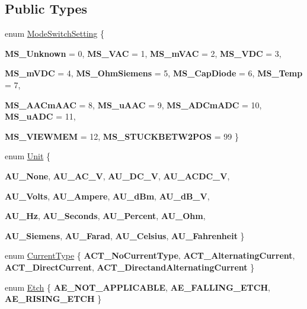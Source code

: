 \subsection*{Public Types}
\begin{DoxyCompactItemize}
\item 
enum \hyperlink{classFluke_1_1Fluke189DataResponseAnalyzerWrapper_a2ec2700a6086ae0ebd9601fe0c0f957a}{ModeSwitchSetting} \{ \par
{\bfseries MS\_\-Unknown} = 0, 
{\bfseries MS\_\-VAC} = 1, 
{\bfseries MS\_\-mVAC} = 2, 
{\bfseries MS\_\-VDC} = 3, 
\par
{\bfseries MS\_\-mVDC} = 4, 
{\bfseries MS\_\-OhmSiemens} = 5, 
{\bfseries MS\_\-CapDiode} = 6, 
{\bfseries MS\_\-Temp} = 7, 
\par
{\bfseries MS\_\-AACmAAC} = 8, 
{\bfseries MS\_\-uAAC} = 9, 
{\bfseries MS\_\-ADCmADC} = 10, 
{\bfseries MS\_\-uADC} = 11, 
\par
{\bfseries MS\_\-VIEWMEM} = 12, 
{\bfseries MS\_\-STUCKBETW2POS} = 99
 \}
\item 
enum \hyperlink{classFluke_1_1Fluke189DataResponseAnalyzerWrapper_ab8e5f2306e4d2ad3d741d273793aaed1}{Unit} \{ \par
{\bfseries AU\_\-None}, 
{\bfseries AU\_\-AC\_\-V}, 
{\bfseries AU\_\-DC\_\-V}, 
{\bfseries AU\_\-ACDC\_\-V}, 
\par
{\bfseries AU\_\-Volts}, 
{\bfseries AU\_\-Ampere}, 
{\bfseries AU\_\-dBm}, 
{\bfseries AU\_\-dB\_\-V}, 
\par
{\bfseries AU\_\-Hz}, 
{\bfseries AU\_\-Seconds}, 
{\bfseries AU\_\-Percent}, 
{\bfseries AU\_\-Ohm}, 
\par
{\bfseries AU\_\-Siemens}, 
{\bfseries AU\_\-Farad}, 
{\bfseries AU\_\-Celsius}, 
{\bfseries AU\_\-Fahrenheit}
 \}
\item 
enum \hyperlink{classFluke_1_1Fluke189DataResponseAnalyzerWrapper_afef24496da239e3613c40ad3582d7adc}{CurrentType} \{ {\bfseries ACT\_\-NoCurrentType}, 
{\bfseries ACT\_\-AlternatingCurrent}, 
{\bfseries ACT\_\-DirectCurrent}, 
{\bfseries ACT\_\-DirectandAlternatingCurrent}
 \}
\item 
enum \hyperlink{classFluke_1_1Fluke189DataResponseAnalyzerWrapper_ada71f6ab32a7b0eb40bb0ed96d7053bc}{Etch} \{ {\bfseries AE\_\-NOT\_\-APPLICABLE}, 
{\bfseries AE\_\-FALLING\_\-ETCH}, 
{\bfseries AE\_\-RISING\_\-ETCH}
 \}
\end{DoxyCompactItemize}
